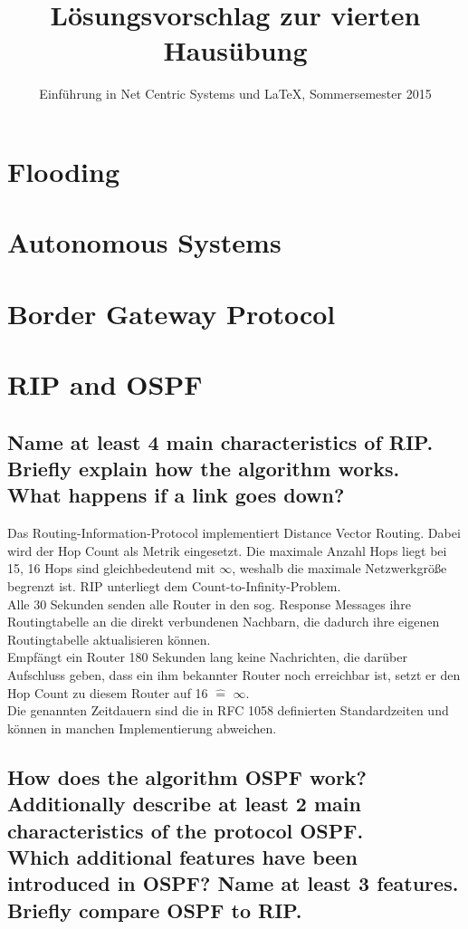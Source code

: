 \documentclass[a4paper,
			llpt,
			solution,
			accentcolor=tud2d,
			colorbacktitle
			]
			{tudexercise}
\title{Lösungsvorschlag zur vierten Hausübung}
\subtitle{Einführung in Net Centric Systems und \LaTeX, Sommersemester 2015}
\newcommand{\8}{$\infty$}
\begin{document}
\maketitle
\section{Flooding}
\section{Autonomous Systems}
\section{Border Gateway Protocol}
\section{RIP and OSPF}
\subsection{Name at least 4 main characteristics of RIP.\\Briefly explain how the algorithm works.\\ What happens if a link goes down?}
Das Routing-Information-Protocol implementiert Distance Vector Routing. Dabei wird der Hop Count als Metrik eingesetzt. Die maximale Anzahl Hops liegt bei 15, 16 Hops sind gleichbedeutend mit \8, weshalb die maximale Netzwerkgröße begrenzt ist. RIP unterliegt dem Count-to-Infinity-Problem.\\
Alle 30 Sekunden senden alle Router in den sog. Response Messages ihre Routingtabelle an die direkt verbundenen Nachbarn, die dadurch ihre eigenen Routingtabelle aktualisieren können.\\
Empfängt ein Router 180 Sekunden lang keine Nachrichten, die darüber Aufschluss geben, dass ein ihm bekannter Router noch erreichbar ist, setzt er den Hop Count zu diesem Router auf 16 $\hat{=}$ \8.\\
Die genannten Zeitdauern sind die in RFC 1058 definierten Standardzeiten und können in manchen Implementierung abweichen.
\subsection{How does the algorithm OSPF work?\\Additionally describe at least 2 main characteristics  of the protocol OSPF.\\Which additional features have been introduced in OSPF? Name at least 3 features.\\Briefly compare OSPF to RIP.}
\end{document}
